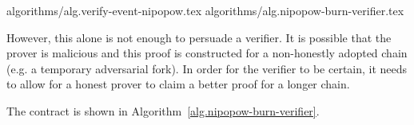 {algorithms/alg.verify-event-nipopow.tex}
{algorithms/alg.nipopow-burn-verifier.tex}

However, this alone is not enough to persuade a verifier. It is possible that the prover is malicious and this proof is constructed for a non-honestly adopted chain (e.g. a temporary adversarial fork). In order for the verifier to be certain, it needs to allow for a honest prover to claim a better proof for a longer chain. 

The contract is shown in Algorithm~\ref{alg.nipopow-burn-verifier}.